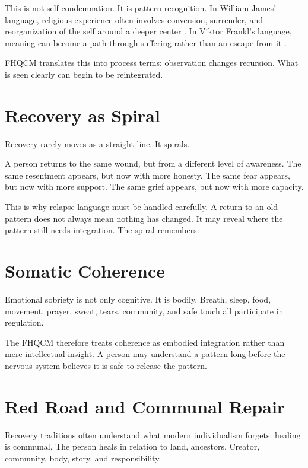This is not self-condemnation. It is pattern recognition. In William James' language, religious experience often involves conversion, surrender, and reorganization of the self around a deeper center \cite{james1902Varieties}. In Viktor Frankl's language, meaning can become a path through suffering rather than an escape from it \cite{frankl1946Meaning}.

FHQCM translates this into process terms: observation changes recursion. What is seen clearly can begin to be reintegrated.

\section{Recovery as Spiral}

Recovery rarely moves as a straight line. It spirals.

A person returns to the same wound, but from a different level of awareness. The same resentment appears, but now with more honesty. The same fear appears, but now with more support. The same grief appears, but now with more capacity.


This is why relapse language must be handled carefully. A return to an old pattern does not always mean nothing has changed. It may reveal where the pattern still needs integration. The spiral remembers.

\section{Somatic Coherence}

Emotional sobriety is not only cognitive. It is bodily. Breath, sleep, food, movement, prayer, sweat, tears, community, and safe touch all participate in regulation.

The FHQCM therefore treats coherence as embodied integration rather than mere intellectual insight. A person may understand a pattern long before the nervous system believes it is safe to release the pattern.

\section{Red Road and Communal Repair}

Recovery traditions often understand what modern individualism forgets: healing is communal. The person heals in relation to land, ancestors, Creator, community, body, story, and responsibility.

